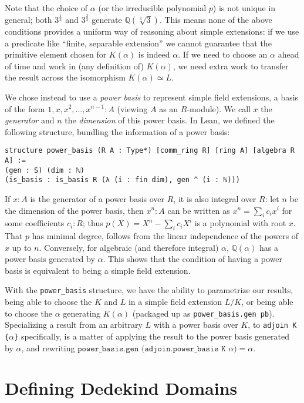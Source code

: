 \documentclass[a4paper,USenglish,cleveref, autoref, thm-restate]{lipics-v2021}
\newcommand{\lean}[1]{\texttt{#1}\xspace} %
\newcommand{\Q}{\mathbb{Q}}
\begin{document}
Note that the choice of $\alpha$ (or the irreducible polynomial $p$) is not unique in general; both $3^\frac{1}{3}$ and $3^\frac{2}{3}$ generate $\Q(\sqrt[3]{3})$.
This means none of the above conditions provides a uniform way of reasoning about simple extensions:
if we use a predicate like ``finite, separable extension'' we cannot guarantee that the primitive element chosen for $K(\alpha)$ is indeed $\alpha$.
If we need to choose an $\alpha$ ahead of time and work in (any definition of) $K(\alpha)$, we need extra work to transfer the result across the isomorphism $K(\alpha) \simeq L$.

We chose instead to use a \emph{power basis} to represent simple field extensions, a basis of the form $1, x, x^2, \dots, x^{n-1} : A$ (viewing $A$ as an $R$-module).
We call $x$ the \emph{generator} and $n$ the \emph{dimension} of this power basis.
In Lean, we defined the following structure, bundling the information of a power basis:
\begin{lstlisting}
structure power_basis (R A : Type*) [comm_ring R] [ring A] [algebra R A] :=
(gen : S) (dim : ℕ)
(is_basis : is_basis R (λ (i : fin dim), gen ^ (i : ℕ)))
\end{lstlisting}

If $x : A$ is the generator of a power basis over $R$, it is also integral over $R$:
let $n$ be the dimension of the power basis, then $x^n : A$ can be written as $x^n = \sum_i c_i x^i$ for some coefficients $c_i : R$;
thus $p(X) = X^n - \sum_i c_i X^i$ is a polynomial with root $x$.
That $p$ has minimal degree, follows from the linear independence of the powers of $x$ up to $n$.
Conversely, for algebraic (and therefore integral) $\alpha$, $\Q(\alpha)$ has a power basis generated by $\alpha$.
This shows that the condition of having a power basis is equivalent to being a simple field extension.

With the \lean{power\_basis} structure, we have the ability to parametrize our results,
being able to choose the $K$ and $L$ in a simple field extension $L / K$,
or being able to choose the $\alpha$ generating $K(\alpha)$ (packaged up as \lean{power\_basis.gen\ pb}).
Specializing a result from an arbitrary $L$ with a power basis over $K$, to \lean{adjoin K \{$\alpha$\}} specifically, is a matter of applying the result to the power basis generated by $\alpha$, and rewriting $\lean{power\_basis.gen (adjoin.power\_basis K $\alpha$)} = \alpha$.


\section{Defining Dedekind Domains}
\end{document}
